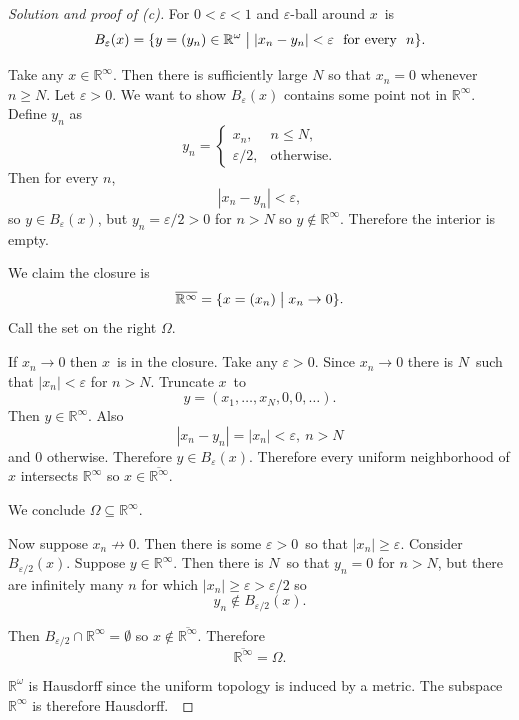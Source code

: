 \begin{proof}[Solution and proof of (c)]
    For $0 < \varepsilon < 1$ and $\varepsilon$-ball 
    around $x$ is 
    \[
        B_\varepsilon(x) = \{y = (y_n) \in 
        \mathbb R^\omega\bigm| |x_n - y_n| < \varepsilon \ \text{
            for every
    } \ n\}. 
    \]

    Take any $x \in \mathbb R^\infty$. Then there is sufficiently 
    large $N$ so that $x_n = 0$ whenever $n \geq N$. 
    Let $\varepsilon > 0$. We want to show 
    $B_\varepsilon(x)$ contains some point not in 
    $\mathbb R^\infty$. 
    Define $y_n$ as 
    \[
        y_n = 
        \begin{cases}
            x_n, & n \leq N, \\ 
            \varepsilon/2, & \text{otherwise}. 
        \end{cases}
    \]  
    Then for every $n$, 
    \[
        |x_n - y_n| < \varepsilon, 
    \]
    so $y \in B_\varepsilon(x)$, but $y_n = \varepsilon / 2 > 0$ 
    for $n > N$ so $y \not\in \mathbb R^\infty$. 
    Therefore the interior is empty. 

    We claim the closure is 
    \[
        \overline{\mathbb R^\infty} = \{x = (x_n) \bigm| 
        x_n \to 0\}. 
    \]
    Call the set on the right $\Omega$.

    If $x_n \to 0$ then $x$ is in the closure. 
    Take any $\varepsilon > 0$. Since $x_n \to 0$ there is 
    $N$ such that $|x_n| < \varepsilon$ for $n > N$. 
    Truncate $x$ to 
    \[
        y = (x_1,\ldots,x_N, 0, 0, \ldots). 
    \]
    Then $y \in \mathbb R^\infty$. Also 
    \[
        |x_n - y_n| = |x_n| < \varepsilon, \ n > N
    \]
    and $0$ otherwise. Therefore $y \in B_\varepsilon(x)$.
    Therefore every uniform neighborhood of $x$ intersects 
    $\mathbb R^\infty$ so $x \in \overline{\mathbb R^\infty}$. 

    We conclude $\Omega \subseteq \mathbb R^\infty$. 

    Now suppose $x_n \not\to 0$. Then there is some 
    $\varepsilon > 0$ so that $|x_n| \geq \varepsilon$.  
    Consider $B_{\varepsilon/2}(x)$. 
    Suppose $y\in \mathbb R^\infty$. Then there is $N$ so that 
    $y_n = 0$ for $n > N$, but there are infinitely many $n$ 
    for which $|x_n| \geq \varepsilon > \varepsilon/2$ so 
    \[
        y_n \not\in B_{\varepsilon/2}(x). 
    \]

    Then $B_{\varepsilon/2} \cap \mathbb R^\infty = \emptyset$ so 
    $x \not\in \overline{\mathbb R^\infty}$. Therefore 
    \[
        \overline{\mathbb R^\infty} = \Omega.
    \]

    $\mathbb R^\omega$ is Hausdorff since the uniform topology 
    is induced by a metric. The subspace $\mathbb R^\infty$ 
    is therefore Hausdorff. 
\end{proof}

